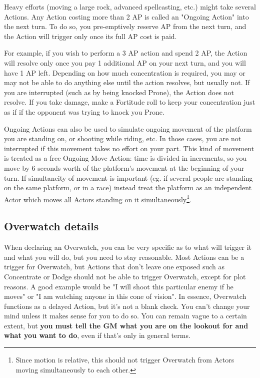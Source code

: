 Heavy efforts (moving a large rock, advanced spellcasting, etc.) might take several Actions. Any Action costing more than 2 AP is called an "Ongoing Action" into the next turn. To do so, you pre-emptively reserve AP from the next turn, and the Action will trigger only once its full AP cost is paid.

For example, if you wish to perform a 3 AP action and spend 2 AP, the Action will resolve only once you pay 1 additional AP on your next turn, and you will have 1 AP left. Depending on how much concentration is required, you may or may not be able to do anything else until the action resolves, but usually not. If you are interrupted (such as by being knocked Prone), the Action does not resolve. If you take damage, make a Fortitude roll to keep your concentration just as if if the opponent was trying to knock you Prone.

Ongoing Actions can also be used to simulate ongoing movement of the platform you are standing on, or shooting while riding, etc. In those cases, you are not interrupted if this movement takes no effort on your part. This kind of movement is treated as a free Ongoing Move Action: time is divided in increments, so you move by 6 seconds worth of the platform's movement at the beginning of your turn. If simultaneity of movement is important (eg. if several people are standing on the same platform, or in a race) instead treat the platform as an independent Actor which moves all Actors standing on it simultaneously\footnote{Since motion is relative, this should not trigger Overwatch from Actors moving simultaneously to each other.}.


\subsection{Overwatch details}

When declaring an Overwatch, you can be very specific as to what will trigger it and what you will do, but you need to stay reasonable. Most Actions can be a trigger for Overwatch, but Actions that don't leave one exposed such as Concentrate or Dodge should not be able to trigger Overwatch, except for plot reasons. A good example would be "I will shoot this particular enemy if he moves" or "I am watching anyone in this cone of vision". In essence, Overwatch functions as a delayed Action, but it's not a blank check. You can't change your mind unless it makes sense for you to do so. You can remain vague to a certain extent, but \textbf{you must tell the GM what you are on the lookout for and what you want to do}, even if that's only in general terms.

